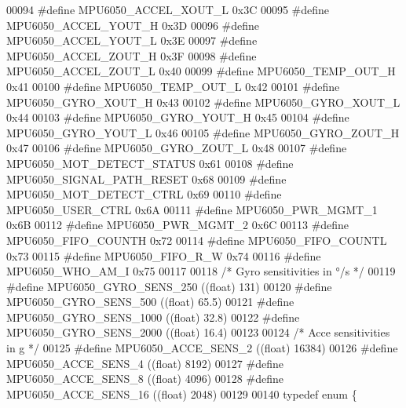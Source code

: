 \begin{DoxyCode}
00094 \textcolor{preprocessor}{#define MPU6050\_ACCEL\_XOUT\_L        0x3C}
00095 \textcolor{preprocessor}{#define MPU6050\_ACCEL\_YOUT\_H        0x3D}
00096 \textcolor{preprocessor}{#define MPU6050\_ACCEL\_YOUT\_L        0x3E}
00097 \textcolor{preprocessor}{#define MPU6050\_ACCEL\_ZOUT\_H        0x3F}
00098 \textcolor{preprocessor}{#define MPU6050\_ACCEL\_ZOUT\_L        0x40}
00099 \textcolor{preprocessor}{#define MPU6050\_TEMP\_OUT\_H          0x41}
00100 \textcolor{preprocessor}{#define MPU6050\_TEMP\_OUT\_L          0x42}
00101 \textcolor{preprocessor}{#define MPU6050\_GYRO\_XOUT\_H         0x43}
00102 \textcolor{preprocessor}{#define MPU6050\_GYRO\_XOUT\_L         0x44}
00103 \textcolor{preprocessor}{#define MPU6050\_GYRO\_YOUT\_H         0x45}
00104 \textcolor{preprocessor}{#define MPU6050\_GYRO\_YOUT\_L         0x46}
00105 \textcolor{preprocessor}{#define MPU6050\_GYRO\_ZOUT\_H         0x47}
00106 \textcolor{preprocessor}{#define MPU6050\_GYRO\_ZOUT\_L         0x48}
00107 \textcolor{preprocessor}{#define MPU6050\_MOT\_DETECT\_STATUS   0x61}
00108 \textcolor{preprocessor}{#define MPU6050\_SIGNAL\_PATH\_RESET   0x68}
00109 \textcolor{preprocessor}{#define MPU6050\_MOT\_DETECT\_CTRL     0x69}
00110 \textcolor{preprocessor}{#define MPU6050\_USER\_CTRL           0x6A}
00111 \textcolor{preprocessor}{#define MPU6050\_PWR\_MGMT\_1          0x6B}
00112 \textcolor{preprocessor}{#define MPU6050\_PWR\_MGMT\_2          0x6C}
00113 \textcolor{preprocessor}{#define MPU6050\_FIFO\_COUNTH         0x72}
00114 \textcolor{preprocessor}{#define MPU6050\_FIFO\_COUNTL         0x73}
00115 \textcolor{preprocessor}{#define MPU6050\_FIFO\_R\_W            0x74}
00116 \textcolor{preprocessor}{#define MPU6050\_WHO\_AM\_I            0x75}
00117 
00118 \textcolor{comment}{/* Gyro sensitivities in °/s */}
00119 \textcolor{preprocessor}{#define MPU6050\_GYRO\_SENS\_250       ((float) 131)}
00120 \textcolor{preprocessor}{#define MPU6050\_GYRO\_SENS\_500       ((float) 65.5)}
00121 \textcolor{preprocessor}{#define MPU6050\_GYRO\_SENS\_1000      ((float) 32.8)}
00122 \textcolor{preprocessor}{#define MPU6050\_GYRO\_SENS\_2000      ((float) 16.4)}
00123 
00124 \textcolor{comment}{/* Acce sensitivities in g */}
00125 \textcolor{preprocessor}{#define MPU6050\_ACCE\_SENS\_2         ((float) 16384)}
00126 \textcolor{preprocessor}{#define MPU6050\_ACCE\_SENS\_4         ((float) 8192)}
00127 \textcolor{preprocessor}{#define MPU6050\_ACCE\_SENS\_8         ((float) 4096)}
00128 \textcolor{preprocessor}{#define MPU6050\_ACCE\_SENS\_16        ((float) 2048)}
00129 
00140 \textcolor{keyword}{typedef} \textcolor{keyword}{enum} \{

\end{DoxyCode}
